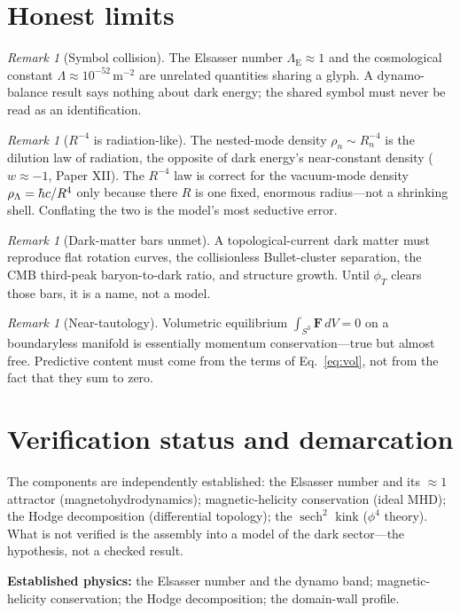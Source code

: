 \documentclass[11pt]{article}
\theoremstyle{remark}
\newtheorem{remark}[theorem]{Remark}
\newcommand{\Els}{\Lambda_{\mathrm{E}}}
\newcommand{\hbb}{\ensuremath{\mathchar'26\mkern-9mu h}}
\begin{document}
\section{Honest limits}
\begin{remark}[Symbol collision]
The Elsasser number $\Els \approx 1$ and the cosmological constant $\Lambda \approx 10^{-52}\,\mathrm{m}^{-2}$ are unrelated quantities sharing a glyph. A dynamo-balance result says nothing about dark energy; the shared symbol must never be read as an identification.
\end{remark}
\begin{remark}[$R^{-4}$ is radiation-like]
The nested-mode density $\rho_n \sim R_n^{-4}$ is the dilution law of radiation, the opposite of dark energy's near-constant density ($w \approx -1$, Paper XII). The $R^{-4}$ law is correct for the vacuum-mode density $\rho_\Lambda = \hbb c/R^4$ only because there $R$ is one fixed, enormous radius---not a shrinking shell. Conflating the two is the model's most seductive error.
\end{remark}
\begin{remark}[Dark-matter bars unmet]
A topological-current dark matter must reproduce flat rotation curves, the collisionless Bullet-cluster separation, the CMB third-peak baryon-to-dark ratio, and structure growth. Until $\phi_T$ clears those bars, it is a name, not a model.
\end{remark}
\begin{remark}[Near-tautology]
Volumetric equilibrium $\int_{S^3}\mathbf{F}\,dV = 0$ on a boundaryless manifold is essentially momentum conservation---true but almost free. Predictive content must come from the terms of Eq.~\eqref{eq:vol}, not from the fact that they sum to zero.
\end{remark}
\section{Verification status and demarcation}
The components are independently established: the Elsasser number and its $\approx 1$ attractor (magnetohydrodynamics); magnetic-helicity conservation (ideal MHD); the Hodge decomposition (differential topology); the $\operatorname{sech}^2$ kink ($\phi^4$ theory). What is not verified is the assembly into a model of the dark sector---the hypothesis, not a checked result.

\textbf{Established physics:} the Elsasser number and the dynamo band; magnetic-helicity conservation; the Hodge decomposition; the domain-wall profile.
\end{document}
